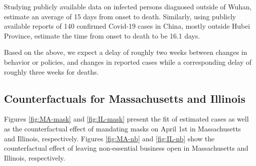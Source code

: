 \documentclass[11pt,reqno,letter]{amsart}
\theoremstyle{definition}
\def\ycolor{\color{red}}
\begin{document}
Studying publicly available data on infected persons diagnosed outside of Wuhan,
\cite{linton2020}  estimate an average of 15 days  from  onset to death. Similarly, using publicly available reports of 140 confirmed Covid-19 cases in China, mostly outside Hubei Province, \cite{sanche2020} estimate the time from onset to death to be  16.1 days.

Based on the above, we expect a delay of roughly two weeks between
changes in behavior or policies, and changes in reported
cases while a corresponding delay of roughly three weeks for deaths.


\FloatBarrier

\subsection{Counterfactuals for Massachusetts and
  Illinois}
 Figures \ref{fig:MA-mask} and \ref{fig:IL-mask} present the fit of estimated cases as well as the counterfactual effect of mandating masks on April 1st in Massachusetts and Illinois, respectively. Figures \ref{fig:MA-nb} and \ref{fig:IL-nb}   show the counterfactual effect of leaving non-essential business open in Massachusetts and Illinois, respectively.
\end{document}
